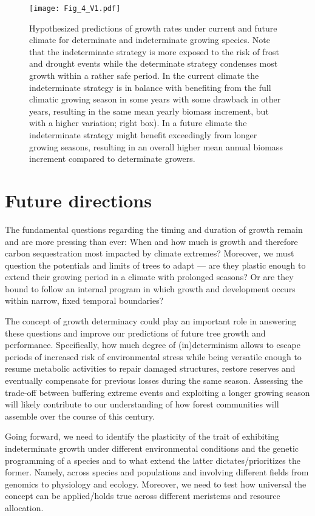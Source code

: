 \documentclass{article}
\begin{document}
								\begin{figure}
								\centering
								\texttt{[image: Fig\_4\_V1.pdf]} 
								\caption{Hypothesized predictions of growth rates under current and future climate for determinate and indeterminate growing species. Note that the indeterminate strategy is more exposed to the risk of frost and drought events while the determinate strategy condenses most growth within a rather safe period. In the current climate the indeterminate strategy is in balance with benefiting from the full climatic growing season in some years with some drawback in other years, resulting in the same mean yearly biomass increment, but with a higher variation; right box). In a future climate the indeterminate strategy might benefit exceedingly from longer growing seasons, resulting in an overall higher mean annual biomass increment compared to determinate growers.}
								\label{fig:fig_4xxx}
							\end{figure}
	
\section*{Future directions}

The fundamental questions regarding the timing and duration of growth remain and are more pressing than ever: When and how much is growth and therefore carbon sequestration most impacted by climate extremes? Moreover, we must question the potentials and limits of trees to adapt --- are they plastic enough to extend their growing period in a climate with prolonged seasons? Or are they bound to follow an internal program in which growth and development occurs within narrow, fixed temporal boundaries? 

The concept of growth determinacy could play an important role in answering these questions and improve our predictions of future tree growth and performance. Specifically, how much degree of (in)determinism allows to escape periods of increased risk of environmental stress while being versatile enough to resume metabolic activities to repair damaged structures, restore reserves and eventually compensate for previous losses during the same season. Assessing the trade-off between buffering extreme events and exploiting a longer growing season will likely contribute to our understanding of how forest communities will assemble over the course of this century.

Going forward, we need to identify the plasticity of the trait of exhibiting indeterminate growth under different environmental conditions and the genetic programming of a species and to what extend the latter dictates/prioritizes the former. Namely, across species and populations and involving different fields from genomics to physiology and ecology. Moreover, we need to test how universal the concept can be applied/holds true across different meristems and resource allocation. %
\end{document}
